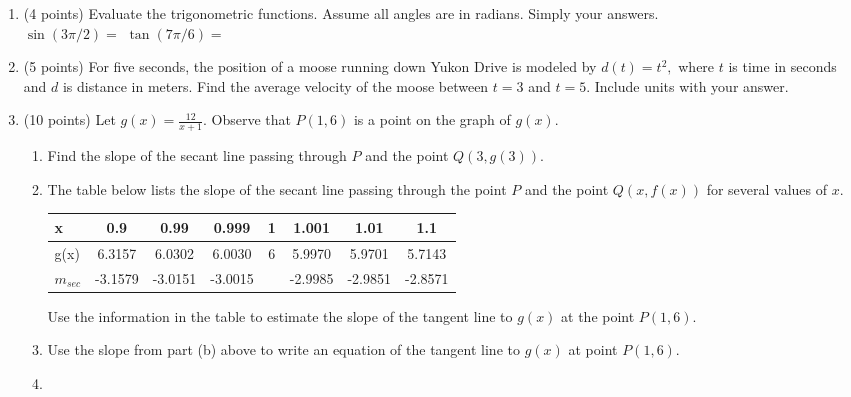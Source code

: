 \documentclass[12pt]{article}
\begin{document}
\begin{enumerate}
 \item (4 points) Evaluate the trigonometric functions. Assume all angles are in radians. Simply your answers.\\
 
 {\large{$\sin(3 \pi/2)=$}} \hfill {\large{$\tan(7\pi/6)=$}}\hspace{1in}\quad
 \vspace{.2in}
\newpage
\thispagestyle{plain}
\vspace*{-2cm}
\item (5 points) For five seconds, the position of a moose running down Yukon Drive is modeled by $d(t)=t^2,$ where $t$ is time in seconds and $d$ is distance in meters. Find the average velocity of the moose between $t=3$ and $t=5.$ Include units with your answer.
\vspace{1in}

\item(10 points) Let $g(x)=\frac{12}{x+1}.$ Observe that $P(1,6)$ is a point on the graph of $g(x).$
\begin{enumerate}
\item Find the slope of the secant line passing through $P$ and the point $Q(3,g(3)).$ 
\vfill

%

\item The table below lists the slope of the secant line passing through the point $P$ and the point $Q(x, f(x))$ for several values of $x.$ 

\begin{tabular}{l || c|c|c|c|c|c|c}
x&0.9&0.99&0.999&1&1.001&1.01&1.1\\
\hline
g(x)&6.3157&6.0302&6.0030&6&5.9970&5.9701&5.7143\\
\hline
$m_{sec}$&-3.1579&-3.0151&-3.0015&&-2.9985&-2.9851&-2.8571
\end{tabular}

\vskip 0.5cm
Use the information in the table to estimate the slope of the tangent line to $g(x)$ at the point $P(1,6).$
\vfill


\item Use the slope from part (b) above to write an equation of the tangent line to $g(x)$ at point $P(1,6).$

\vfill

\item \quad 

\begin{multicols}{2}


\end{multicols}
\end{enumerate}
\end{enumerate}
\end{document}
